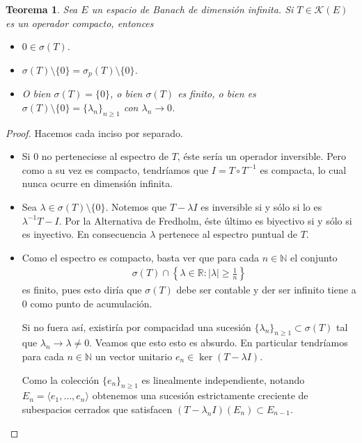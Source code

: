 \documentclass[11pt]{report}
\theoremstyle{colored}
\newtheorem{theorem}{Teorema}[section]
\newcommand{\N}{\mathbb{N}}
\newcommand{\R}{\mathbb{R}}
\begin{document}
\begin{theorem} Sea $E$ un espacio de Banach de dimensión infinita. Si $T \in \mathscr{K}(E)$ es un operador compacto, entonces
\begin{itemize}
\item[(i)] $0 \in \sigma(T)$.
\item[(ii)] $\sigma(T) \setminus \{0\} = \sigma_p(T) \setminus \{0\}$.
\item[(iii)] O bien $\sigma(T) = \{0\}$, o bien $\sigma(T)$ es finito, o bien es $\sigma(T) \setminus \{0\} = \{\lambda_n\}_{n \geq 1}$ con $\lambda_n \to 0$.
\end{itemize} 
\end{theorem}
\begin{proof} Hacemos cada inciso por separado.
\begin{itemize}[listparindent = \parindent]
\item[(i)] Si $0$ no perteneciese al espectro de $T$, éste sería un operador inversible. Pero como a su vez es compacto, tendríamos que $I = T \circ T^{-1}$ es compacta, lo cual nunca ocurre en dimensión infinita.
\item[(ii)] Sea $\lambda \in \sigma(T) \setminus \{0\}$. Notemos que $T-\lambda I$ es inversible si y sólo si lo es $\lambda^{-1}T-I$. Por la Alternativa de Fredholm, éste último es biyectivo si y sólo si es inyectivo. En consecuencia $\lambda$ pertenece al espectro puntual de $T$.
\item[(iii)] Como el espectro es compacto, basta ver que para cada $n \in \N$  el conjunto
\begin{align*}
\sigma(T) \cap \left\{\lambda \in \R : |\lambda| \geq \frac{1}{n}\right\}
\end{align*}
es finito, pues esto diría que $\sigma(T)$ debe ser contable y der ser infinito tiene a $0$ como punto de acumulación.

Si no fuera así, existiría por compacidad una sucesión $\{\lambda_n\}_{n \geq 1} \subset \sigma(T)$ tal que $\lambda_n \to \lambda \neq 0$. Veamos que esto esto es absurdo. En particular tendríamos para cada $n \in \N$ un vector unitario $e_n \in \ker (T-\lambda I)$. 

Como la colección $\{e_n\}_{n \geq 1}$ es linealmente independiente,  notando $E_n = \langle e_1, \dots, e_n \rangle$ obtenemos una sucesión estrictamente creciente de subespacios cerrados que satisfacen $(T-\lambda_nI)(E_n) \subset E_{n-1}$.


\end{itemize}
\end{proof}
\end{document}
